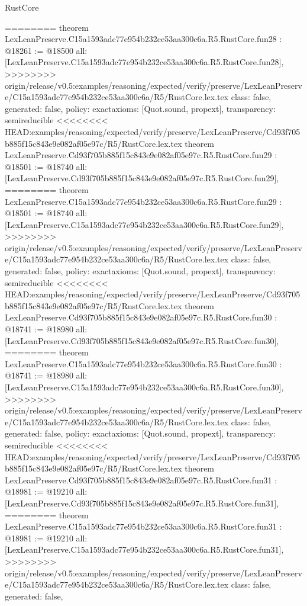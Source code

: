 \begin{lexlean}{RustCore}
\begin{coremodule}
{\begin{coremodule}
{{{{{{{{{{{{{{{{{{{{{{{{{{{{{{{========
theorem LexLeanPreserve.C15a1593adc77e954b232ce53aa300c6a.R5.RustCore.fun28 : @18261 := @18500 {
  all: [LexLeanPreserve.C15a1593adc77e954b232ce53aa300c6a.R5.RustCore.fun28],
>>>>>>>> origin/release/v0.5:examples/reasoning/expected/verify/preserve/LexLeanPreserve/C15a1593adc77e954b232ce53aa300c6a/R5/RustCore.lex.tex
  class: false,
  generated: false,
  policy: exact{axioms: [Quot.sound, propext]},
  transparency: semireducible
}
<<<<<<<< HEAD:examples/reasoning/expected/verify/preserve/LexLeanPreserve/Cd93f705b885f15c843e9e082af05e97c/R5/RustCore.lex.tex
theorem LexLeanPreserve.Cd93f705b885f15c843e9e082af05e97c.R5.RustCore.fun29 : @18501 := @18740 {
  all: [LexLeanPreserve.Cd93f705b885f15c843e9e082af05e97c.R5.RustCore.fun29],
========
theorem LexLeanPreserve.C15a1593adc77e954b232ce53aa300c6a.R5.RustCore.fun29 : @18501 := @18740 {
  all: [LexLeanPreserve.C15a1593adc77e954b232ce53aa300c6a.R5.RustCore.fun29],
>>>>>>>> origin/release/v0.5:examples/reasoning/expected/verify/preserve/LexLeanPreserve/C15a1593adc77e954b232ce53aa300c6a/R5/RustCore.lex.tex
  class: false,
  generated: false,
  policy: exact{axioms: [Quot.sound, propext]},
  transparency: semireducible
}
<<<<<<<< HEAD:examples/reasoning/expected/verify/preserve/LexLeanPreserve/Cd93f705b885f15c843e9e082af05e97c/R5/RustCore.lex.tex
theorem LexLeanPreserve.Cd93f705b885f15c843e9e082af05e97c.R5.RustCore.fun30 : @18741 := @18980 {
  all: [LexLeanPreserve.Cd93f705b885f15c843e9e082af05e97c.R5.RustCore.fun30],
========
theorem LexLeanPreserve.C15a1593adc77e954b232ce53aa300c6a.R5.RustCore.fun30 : @18741 := @18980 {
  all: [LexLeanPreserve.C15a1593adc77e954b232ce53aa300c6a.R5.RustCore.fun30],
>>>>>>>> origin/release/v0.5:examples/reasoning/expected/verify/preserve/LexLeanPreserve/C15a1593adc77e954b232ce53aa300c6a/R5/RustCore.lex.tex
  class: false,
  generated: false,
  policy: exact{axioms: [Quot.sound, propext]},
  transparency: semireducible
}
<<<<<<<< HEAD:examples/reasoning/expected/verify/preserve/LexLeanPreserve/Cd93f705b885f15c843e9e082af05e97c/R5/RustCore.lex.tex
theorem LexLeanPreserve.Cd93f705b885f15c843e9e082af05e97c.R5.RustCore.fun31 : @18981 := @19210 {
  all: [LexLeanPreserve.Cd93f705b885f15c843e9e082af05e97c.R5.RustCore.fun31],
========
theorem LexLeanPreserve.C15a1593adc77e954b232ce53aa300c6a.R5.RustCore.fun31 : @18981 := @19210 {
  all: [LexLeanPreserve.C15a1593adc77e954b232ce53aa300c6a.R5.RustCore.fun31],
>>>>>>>> origin/release/v0.5:examples/reasoning/expected/verify/preserve/LexLeanPreserve/C15a1593adc77e954b232ce53aa300c6a/R5/RustCore.lex.tex
  class: false,
  generated: false,
}}}}}}}}}}}}}}}}}}}}}}}}}}}}}}}}}}}
\end{coremodule}}
\end{coremodule}
\end{lexlean}
